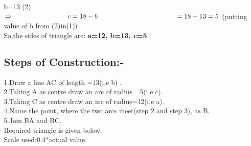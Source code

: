 \documentclass[a4paper,12pt]{article}
\begin{document}
\vspace*{0.3cm}

\hspace*{3cm} b=13 \hspace*{2cm}(2)\\

$\Rightarrow \hspace*{2.8cm} c=18-b \\
 \hspace*{4cm}=18-13 = 5$    \hspace*{1cm}(putting value of b from (2)in(1))\\



{\large So,the sides of triangle are:\textbf{ a=12,   b=13,  c=5}.}

\vspace*{1mm}

\subsection*{Steps of Construction:-}
 \hspace*{0.7cm }1.Draw a line AC of length =13(i,e b) .\\
	 
	 2.Taking A as centre draw an arc of radius =5(i,e c).\\
	 
	 3.Taking C as centre draw an arc of radius=12(i,e a).\\
	 
	 4.Name the point, where the two arcs meet(step 2 and step 3), as B.\\
	 
	 5.Join BA and BC.\\

      Required triangle is given below.\\
      
      Scale used:0.4*actual value.
      
      \vspace*{1cm}
          
\begin{center}
\end{center}
\end{document}
